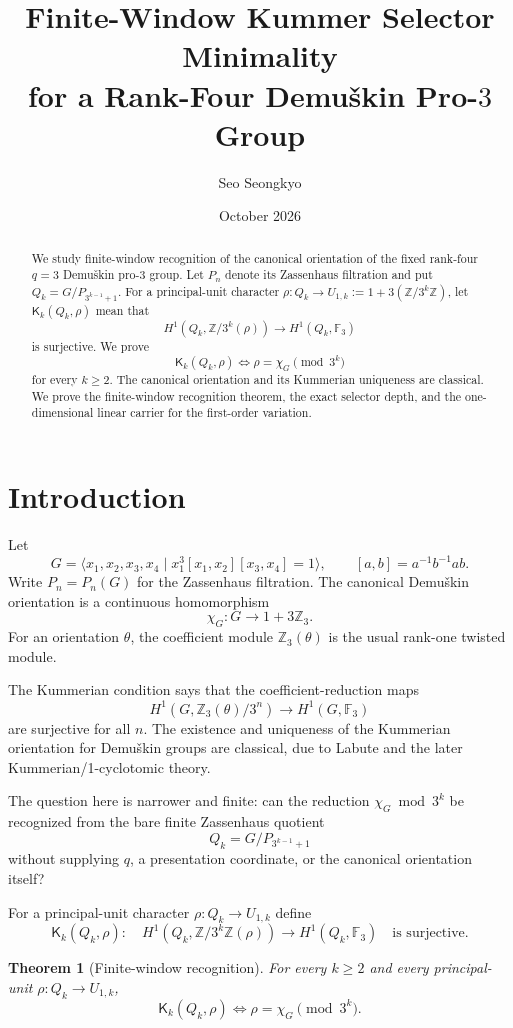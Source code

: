 \documentclass[11pt]{article}
\title{Finite-Window Kummer Selector Minimality\\for a Rank-Four Demu\v{s}kin Pro-$3$ Group}
\author{Seo Seongkyo}
\date{October 2026}
\newtheorem{theorem}{Theorem}[section]
\newcommand{\Ak}{\mathbb Z/3^k\mathbb Z}
\newcommand{\Kk}{\mathsf K_k}
\begin{document}
\maketitle

\begin{abstract}
We study finite-window recognition of the canonical orientation of the fixed
rank-four $q=3$ Demu\v{s}kin pro-$3$ group. Let $P_n$ denote its Zassenhaus
filtration and put $Q_k=G/P_{3^{k-1}+1}$. For a principal-unit character
$\rho:Q_k\to U_{1,k}:=1+3(\mathbb Z/3^k\mathbb Z)$, let
$\mathsf K_k(Q_k,\rho)$ mean that
\[
H^1(Q_k,\mathbb Z/3^k(\rho))\longrightarrow H^1(Q_k,\mathbb F_3)
\]
is surjective. We prove
\[
\mathsf K_k(Q_k,\rho)\Longleftrightarrow
\rho=\chi_G\pmod{3^k}
\]
for every $k\ge2$. The canonical orientation and its Kummerian uniqueness are classical. We prove the finite-window recognition theorem, the exact selector depth, and the one-dimensional linear carrier for the first-order variation.
\end{abstract}

\section{Introduction}

Let
\[
G=\langle x_1,x_2,x_3,x_4\mid
x_1^3[x_1,x_2][x_3,x_4]=1\rangle,
\qquad [a,b]=a^{-1}b^{-1}ab.
\]
Write $P_n=P_n(G)$ for the Zassenhaus filtration. The canonical
Demu\v{s}kin orientation is a continuous homomorphism
\[
\chi_G:G\longrightarrow 1+3\mathbb Z_3.
\]
For an orientation $\theta$, the coefficient module
$\mathbb Z_3(\theta)$ is the usual rank-one twisted module.

The Kummerian condition says that the coefficient-reduction maps
\[
H^1(G,\mathbb Z_3(\theta)/3^n)
\longrightarrow H^1(G,\mathbb F_3)
\]
are surjective for all $n$. The existence and uniqueness of the
Kummerian orientation for Demu\v{s}kin groups are classical, due to
Labute and the later Kummerian/1-cyclotomic theory.

The question here is narrower and finite:
can the reduction $\chi_G\bmod 3^k$ be recognized from the bare finite
Zassenhaus quotient
\[
Q_k=G/P_{3^{k-1}+1}
\]
without supplying $q$, a presentation coordinate, or the canonical
orientation itself?

For a principal-unit character $\rho:Q_k\to U_{1,k}$ define
\[
\Kk(Q_k,\rho):
\quad
H^1(Q_k,\Ak(\rho))
\longrightarrow H^1(Q_k,\mathbb F_3)
\quad\text{is surjective}.
\]

\begin{theorem}[Finite-window recognition]
For every $k\ge2$ and every principal-unit
$\rho:Q_k\to U_{1,k}$,
\[
\boxed{
\Kk(Q_k,\rho)\Longleftrightarrow
\rho=\chi_G\pmod{3^k}.
}
\]
\end{theorem}
\end{document}
